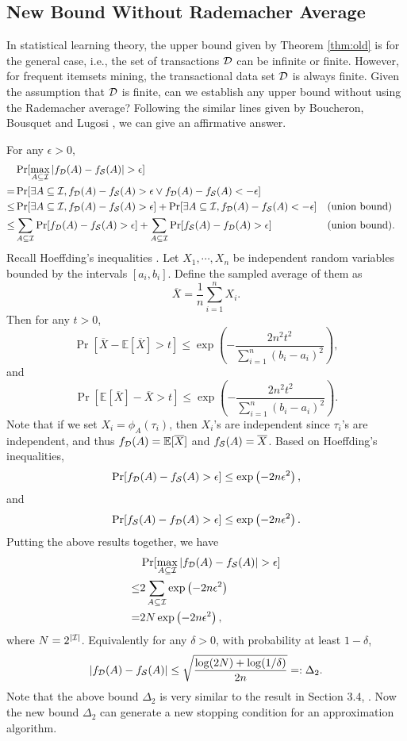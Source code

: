 \documentclass{article}
\begin{document}
\subsection{New Bound Without Rademacher Average}
In statistical learning theory, the upper bound given by Theorem \ref{thm:old} is for the general case, i.e., the set of transactions $\mathcal{D}$ can be infinite or finite. However, for frequent itemsets mining, the transactional data set $\mathcal{D}$ is always finite. Given the assumption that $\mathcal{D}$ is finite, can we establish any upper bound without using the Rademacher average? Following the similar lines given by Boucheron, Bousquet and Lugosi \cite{BBL04}, we can give an affirmative answer.

For any $\epsilon > 0$,
$$\begin{aligned}
& \Pr[\max_{A\subseteq\I}|f_\D(A)-f_\Smp(A)|>\epsilon] \\
= & \Pr[\exists A\subseteq\I, f_\D(A)-f_\Smp(A)>\epsilon \vee f_\D(A)-f_\Smp(A)<-\epsilon] \\
\leq & \Pr[\exists A\subseteq\I, f_\D(A)-f_\Smp(A)>\epsilon] +\Pr[\exists A\subseteq\I, f_\D(A)-f_\Smp(A)<-\epsilon] && \textrm{(union bound)}\\
\leq & \sum_{A\subseteq\I} \Pr[f_\D(A)-f_\Smp(A)>\epsilon] + \sum_{A\subseteq\I} \Pr[f_\Smp(A)-f_\D(A)>\epsilon] && \textrm{(union bound)}.
\end{aligned}$$
Recall Hoeffding's inequalities \cite{H63}. Let $X_1, \cdots, X_n$ be independent random variables bounded by the intervals $[a_i, b_i]$. Define the sampled average of them as
$$\overline{X} = \frac{1}{n}\sum_{i=1}^n X_i.$$
Then for any $t>0$,
$$\Pr[\overline{X} - \mathbb{E}[\overline{X}] > t] \leq \exp\left(-\frac{2n^2t^2}{\sum_{i=1}^n (b_i-a_i)^2}\right),$$
and
$$\Pr[\mathbb{E}[\overline{X}] - \overline{X} > t] \leq \exp\left(-\frac{2n^2t^2}{\sum_{i=1}^n (b_i-a_i)^2}\right).$$
Note that if we set $X_i = \phi_A(\tau_i)$, then $X_i$'s are independent since $\tau_i$'s are independent, and thus $f_{\mathcal{D}}(A) = \mathbb{E}[\overline{X}]$ and $f_{\mathcal{S}}(A) = \overline{X}$. Based on Hoeffding's inequalities, 
$$\Pr[f_{\mathcal{D}}(A) - f_{\mathcal{S}}(A) > \epsilon] \leq \exp\left(-2n\epsilon^2\right),$$
and
$$\Pr[f_{\mathcal{S}}(A) - f_{\mathcal{D}}(A) > \epsilon] \leq \exp\left(-2n\epsilon^2\right).$$
Putting the above results together, we have
$$\begin{aligned}
& \Pr[\max_{A\subseteq\I}|f_\D(A)-f_\Smp(A)|>\epsilon] \\
\leq & 2\sum_{A\subseteq\I} \exp\left(-2n\epsilon^2\right) \\
= & 2N \exp\left(-2n\epsilon^2\right),
\end{aligned}$$
where $N = 2^{|\mathcal{I}|}$. 
Equivalently for any $\delta>0$, with probability at least $1-\delta$,
$$|f_{\mathcal{D}}(A)-f_{\mathcal{S}}(A)| \leq \sqrt{\frac{\log(2N) + \log(1/\delta)}{2n}} =: \Delta_2.$$
Note that the above bound $\Delta_2$ is very similar to the result in Section 3.4, \cite{BBL04}. Now the new bound $\Delta_2$ can generate a new stopping condition for an approximation algorithm.
\end{document}
